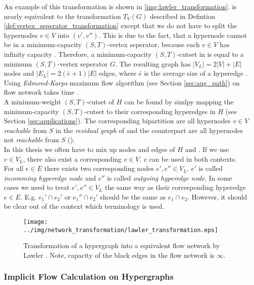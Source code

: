 An example of this transformation is shown in \autoref{img:lawler_transformation}.
 is nearly equivalent to the transformation $T_V(G)$ described in Defintion \autoref{def:vertex_seperator_transformation}
except that we do not have to split the hypernodes $v \in V$ into $(v',v'')$. This is due to the fact, that
a hypernode cannot be in a minimum-capacity $(S,T)$-vertex seperator, because each $v \in V$ has
infinity capacity \cite{HuMoerder85}.
Therefore, a minimum-capacity $(S,T)$-cutset in  is equal to a minimum $(S,T)$-vertex seperator $G$.
The resulting graph  has $|V_L| = 2|V| + |E|$ nodes and $|E_L| = 2(\bar{e}+1)|E|$ edges, where
$\bar{e}$ is the average size of a hyperedge \cite{pistorius2003}. Using \emph{Edmond-Karps}
maximum flow algorithm (see Section \ref{sec:aug_path}) on flow network  
takes time  \cite{lawler1973}. \\
A minimum-weight $(S,T)$-cutset of $H$ can be found by simlpy mapping the minimum-capacity
$(S,T)$-cutset to their corresponding hyperedges in $H$ (see Section \ref{sec:applications}). 
The corresponding bipartition are all hypernodes $v \in V$ \emph{reachable} from $S$ in the 
\emph{residual graph} of  and the counterpart are all hypernodes not \emph{reachable}
from $S$ (). \\
In this thesis we often have to mix up nodes and edges of $H$ and . If we use
$v \in V_L$, there also exist a corresponding $v \in V$. $v$ can be used in both contexts.
For all $e \in E$ there exists two corresponding nodes $e',e'' \in V_L$. $e'$ 
is called \emph{incomming hyperedge node} and $e''$ is called \emph{outgoing hyperedge node}. 
In some cases we need to treat $e',e'' \in V_L$ the same way as their corresponding 
hyperedge $e \in E$. E.g. $e_1' \cap e_2'$ or $e_1'' \cap e_2'$ should be the same as $e_1 \cap e_2$.
However, it should be clear out of the context which terminology is used.


\begin{figure}
\centering
\texttt{[image: ../img/network\_transformation/lawler\_transformation.eps]}
\caption{Transformation of a hypergraph into a equivalent flow network by Lawler \cite{lawler1973}. Note,
capacity of the black edges in the flow network is $\infty$.}
\label{img:lawler_transformation}
\end{figure}

\subsubsection{Implicit Flow Calculation on Hypergraphs}

